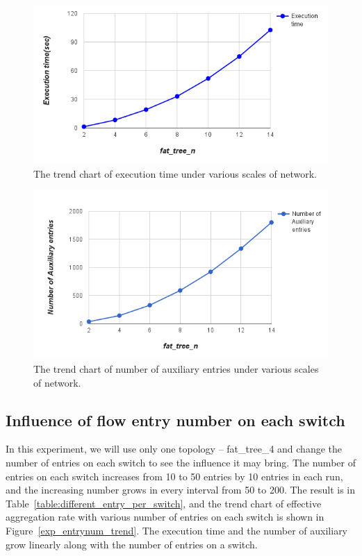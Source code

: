 \begin{figure}[H]
\begin{center} 
\includegraphics[width=1\textwidth]{figures/exp_scale_time_trend.png}
\end{center}
\caption{The trend chart of execution time under various scales of network.}
\label{different_scale_time_trend}
\end{figure}

\begin{figure}[H]
\begin{center} 
\includegraphics[width=1\textwidth]{figures/exp_scale_aux_trend.png}
\end{center}
\caption{The trend chart of number of auxiliary entries under various scales of network.}
\label{different_scale_aux_trend}
\end{figure}

\subsection{Influence of flow entry number on each switch}
In this experiment, we will use only one topology -- fat\_tree\_4 and change the number of entries on each switch to see the influence it may bring. The number of entries on each switch increases from 10 to 50 entries by 10 entries in each run, and the increasing number grows in every interval from 50 to 200. The result is in Table~\ref{table:different_entry_per_switch}, and the trend chart of effective aggregation rate with various number of entries on each switch is shown in Figure~\ref{exp_entrynum_trend}. The execution time and the number of auxiliary grow linearly along with the number of entries on a switch.

